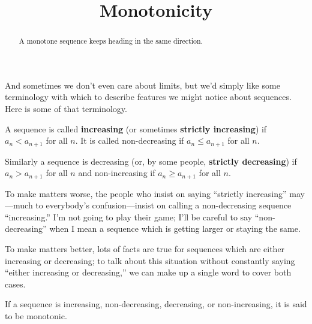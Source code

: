 \documentclass{ximera}
\title{Monotonicity}
\newcommand{\defnword}[1]{\textbf{#1}}
\newcommand{\ds}{\displaystyle}
\renewcommand{\index}[1]{}
\renewcommand{\label}[1]{}
\begin{document}
\begin{abstract}
  A monotone sequence keeps heading in the same direction.
\end{abstract}

\maketitle

\label{subsection:monotonicity}

And sometimes we don't even care about limits, but we'd simply like
some terminology with which to describe features we might notice about
sequences.  Here is some of that terminology.


\begin{definition}
  A sequence is called
  \defnword{increasing}\index{sequence!increasing} (or sometimes
  \defnword{strictly increasing}) if $\ds a_n<a_{n+1}$ for all $n$.
  It is called {\dfont
    non-decreasing\index{sequence!non-decreasing}\/} if $\ds a_n\le
  a_{n+1}$ for all $n$.

  Similarly a sequence is {\dfont
    decreasing\index{sequence!decreasing}\/} (or, by some people,
  \defnword{strictly decreasing}) if $\ds a_n>a_{n+1}$ for all $n$ and
  {\dfont non-increasing\index{sequence!non-increasing}\/} if $\ds
  a_n\ge a_{n+1}$ for all $n$.
\end{definition}
To make matters worse, the people who insist on saying ``strictly
increasing'' may---much to everybody's confusion---insist on calling a
non-decreasing sequence ``increasing.'' I'm not going to play their
game; I'll be careful to say ``non-decreasing'' when I mean a sequence
which is getting larger or staying the same.

To make matters better, lots of facts are true for sequences which are
either increasing or decreasing; to talk about this situation without
constantly saying ``either increasing or decreasing,'' we can make up
a single word to cover both cases.
\begin{definition}
  If a sequence is increasing, non-decreasing, decreasing, or
  non-increasing, it is said to be {\dfont
    monotonic\index{sequence!monotonic}\/}.
\end{definition}

\end{document}
